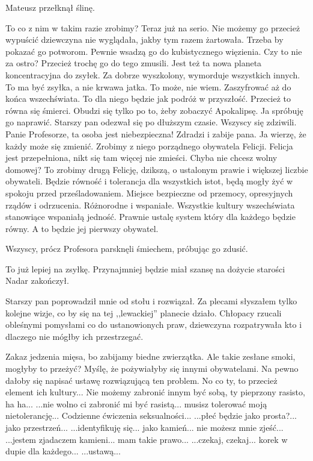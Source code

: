 Mateusz przełknął ślinę.

\begin{dialogue}
\ds{} To co z nim w takim razie zrobimy? Teraz już na serio. Nie możemy go przecież wypuścić \dm{} dziewczyna nie wyglądała, jakby tym razem żartowała.
\ds{} Trzeba by pokazać go potworom. Pewnie wsadzą go do kubistycznego więzienia.
\ds{} Czy to nie za ostro? Przecież trochę go do tego zmusili. Jest też ta nowa planeta koncentracyjna do zsyłek.
\ds{} Za dobrze wyszkolony, wymorduje wszystkich innych. To ma być zsyłka, a nie krwawa jatka.
\ds{} To może, nie wiem. Zaszyfrować aż do końca wszechświata. To dla niego będzie jak podróż w przyszłość.
\ds{} Przecież to równa się śmierci. Obudzi się tylko po to, żeby zobaczyć Apokalipsę.
\ds{} Ja spróbuję go naprawić. \dm{} Starszy pan odezwał się po dłuższym czasie. Wszyscy się zdziwili.
\ds{} Panie Profesorze, ta osoba jest niebezpieczna! Zdradzi i zabije pana.
\ds{} Ja wierzę, że każdy może się zmienić. Zrobimy z niego porządnego obywatela Felicji.
\ds{} Felicja jest przepełniona, nikt się tam więcej nie zmieści. Chyba nie chcesz wolny domowej?
\ds{} To zrobimy drugą Felicję, dzikszą, o ustalonym prawie i większej liczbie obywateli. Będzie równość i tolerancja dla wszystkich istot, będą mogły żyć w spokoju przed prześladowaniem.
Miejsce bezpieczne od przemocy, opresyjnych rządów i odrzucenia. Różnorodne i wspaniałe. Wszystkie kultury wszechświata stanowiące wspaniałą jedność.
Prawnie ustalę system który dla każdego będzie równy.
A to będzie jej pierwszy obywatel.
\end{dialogue}

Wszyscy, prócz Profesora parsknęli śmiechem, próbując go zdusić.

\begin{dialogue}
\ds{} To już lepiej na zsyłkę. Przynajmniej będzie miał szansę na dożycie starości \dm{} Nadar zakończył.
\end{dialogue}

Starszy pan poprowadził mnie od stołu i rozwiązał. Za plecami słyszałem tylko kolejne wizje, co by się na tej ,,lewackiej'' planecie działo.
Chłopacy rzucali obleśnymi pomysłami co do ustanowionych praw, dziewczyna rozpatrywała kto i dlaczego nie mógłby ich przestrzegać.
\begin{dialogue}
\ds{} Zakaz jedzenia mięsa, bo zabijamy biedne zwierzątka.
\ds{} Ale takie zesłane smoki, mogłyby to przeżyć?
\ds{} Myślę, że pożywiałyby się innymi obywatelami.
\ds{} Na pewno dałoby się napisać ustawę rozwiązującą ten problem.
\ds{} No co ty, to przecież element ich kultury...
\ds{} Nie możemy zabronić innym być sobą, ty pieprzony rasisto, ha ha...
\ds{} ...nie wolno ci zabronić mi być rasistą... musisz tolerować moją nietolerancję...
\ds{} Codzienne ćwiczenia seksualności...
\ds{} ...płeć będzie jako prosta?... jako przestrzeń...
\ds{} ...identyfikuję się... jako kamień... nie możesz mnie zjeść...
\ds{} ...jestem zjadaczem kamieni... mam takie prawo...
\ds{} ...czekaj, czekaj... korek w dupie dla każdego...
\ds{} ...ustawą...
\end{dialogue}

